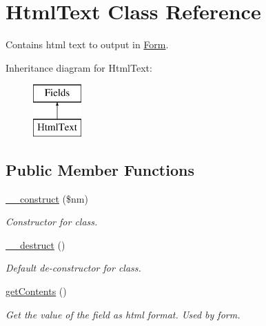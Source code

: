 \hypertarget{class_html_text}{\section{Html\-Text Class Reference}
\label{class_html_text}
}


Contains html text to output in \hyperlink{class_form}{Form}.  


Inheritance diagram for Html\-Text\-:\begin{figure}[H]
\begin{center}
\leavevmode
\includegraphics[height=2.000000cm]{class_html_text}
\end{center}
\end{figure}
\subsection*{Public Member Functions}
\begin{DoxyCompactItemize}
\item 
\hyperlink{class_html_text_ac610fc08cbb0781b26136636de129bc0}{\-\_\-\-\_\-construct} (\$nm)
\begin{DoxyCompactList}\small\item\em Constructor for class. \end{DoxyCompactList}\item 
\hypertarget{class_html_text_a421831a265621325e1fdd19aace0c758}{\hyperlink{class_html_text_a421831a265621325e1fdd19aace0c758}{\-\_\-\-\_\-destruct} ()}\label{class_html_text_a421831a265621325e1fdd19aace0c758}

\begin{DoxyCompactList}\small\item\em Default de-\/constructor for class. \end{DoxyCompactList}\item 
\hypertarget{class_html_text_a14814e04b348120748912692645f3a75}{\hyperlink{class_html_text_a14814e04b348120748912692645f3a75}{get\-Contents} ()}\label{class_html_text_a14814e04b348120748912692645f3a75}

\begin{DoxyCompactList}\small\item\em Get the value of the field as html format. Used by form. \end{DoxyCompactList}\end{DoxyCompactItemize}
